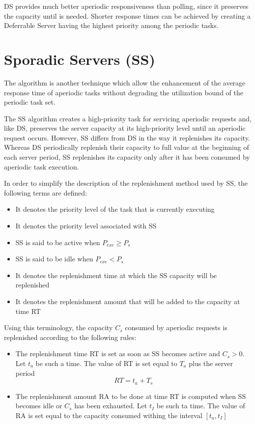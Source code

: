 DS provides much better aperiodic responsiveness than polling, since it preserves the capacity until is needed. Shorter response times can be achieved by creating a Deferrable Server having the highest priority among the periodic tasks.

\section{Sporadic Servers (SS)}

The  algorithm is another technique which allow the enhancement of the average response time of aperiodic  tasks without degrading the utilization bound of the periodic task set.

The SS algorithm creates a high-priority task for servicing aperiodic requests and, like DS, preserves the server capacity at its high-priority level until an aperiodic request occurs. However, SS differs from DS in the way it replenishes its capacity. Whereas DS periodically replenish their capacity to full value at the beginning of each server period, SS replenishes its capacity only after it has been consumed by aperiodic task execution.

In order to simplify the description of the replenishment method used by SS, the following terms are defined:
\begin{itemize}
    \item{ It denotes the priority level of the task that is currently executing}
    \item{ It denotes the priority level associated with SS}
    \item{SS is said to be active when $P_{exe}\ge P_s$}
    \item{SS is said to be idle when $P_{exe} < P_s$}
    \item{ It denotes the replenishment time at which the SS capacity will be replenished}
    \item{It denotes the replenishment amount that will be added to the capacity at time RT}
\end{itemize}

Using this terminology, the capacity $C_s$ consumed by aperiodic requests is replenished according to the following rules:
\begin{itemize}
    \item The replenishment time RT is set as soon as SS becomes active and $C_s > 0$. Let $t_a$ be such a time. The value of RT is set equal to $T_a$ plus the server period
     \[RT = t_a + T_s\]
    \item The replenishment amount RA to be done at time RT is computed when SS becomes idle or $C_s$ has been exhausted. Let $t_I$ be such ta time. The value of RA is set equal to the capacity consumed withing the interval $[t_a, t_I]$ 
\end{itemize}

